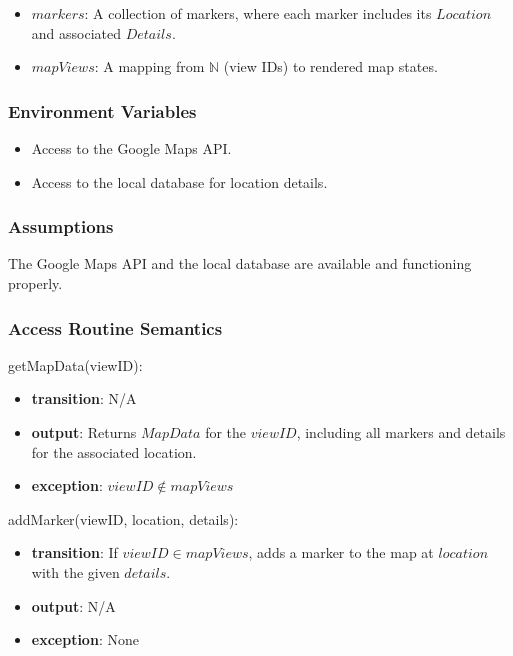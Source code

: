 \documentclass[12pt, titlepage]{article}
\begin{document}
\begin{itemize}
  \item \( markers \): A collection of markers, where each marker includes its \( Location \) and associated \( Details \).
  \item \( mapViews \): A mapping from \( \mathbb{N} \) (view IDs) to rendered map states.
\end{itemize}

\subsubsection{Environment Variables}

\begin{itemize}
  \item Access to the Google Maps API.
  \item Access to the local database for location details.
\end{itemize}

\subsubsection{Assumptions}

The Google Maps API and the local database are available and functioning properly.

\subsubsection{Access Routine Semantics}

\noindent getMapData(viewID):
\begin{itemize}
  \item \textbf{transition}: N/A
  \item \textbf{output}: Returns \( MapData \) for the \( viewID \), including all markers and details for the associated location.
  \item \textbf{exception}: \( viewID \notin mapViews \)
\end{itemize}

\noindent addMarker(viewID, location, details):
\begin{itemize}
  \item \textbf{transition}:
        If \( viewID \in mapViews \), adds a marker to the map at \( location \) with the given \( details \).
  \item \textbf{output}: N/A
  \item \textbf{exception}: None
\end{itemize}
\end{document}
